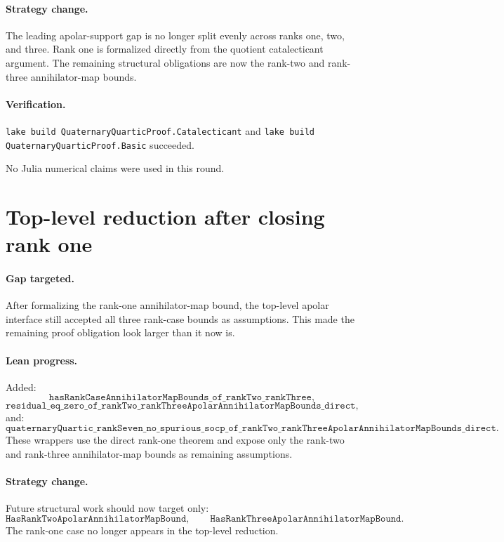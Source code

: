 \documentclass[11pt]{article}
\begin{document}
\paragraph{Strategy change.}
The leading apolar-support gap is no longer split evenly across ranks one,
two, and three.  Rank one is formalized directly from the quotient
catalecticant argument.  The remaining structural obligations are now the
rank-two and rank-three annihilator-map bounds.

\paragraph{Verification.}
\texttt{lake build QuaternaryQuarticProof.Catalecticant} and
\texttt{lake build QuaternaryQuarticProof.Basic} succeeded.

No Julia numerical claims were used in this round.

\section*{Top-level reduction after closing rank one}

\paragraph{Gap targeted.}
After formalizing the rank-one annihilator-map bound, the top-level apolar
interface still accepted all three rank-case bounds as assumptions.  This made
the remaining proof obligation look larger than it now is.

\paragraph{Lean progress.}
Added:
\[
\texttt{hasRankCaseAnnihilatorMapBounds\_of\_rankTwo\_rankThree},
\]
\[
\texttt{residual\_eq\_zero\_of\_rankTwo\_rankThreeApolarAnnihilatorMapBounds\_direct},
\]
and:
\[
\texttt{quaternaryQuartic\_rankSeven\_no\_spurious\_socp\_of\_rankTwo\_rankThreeApolarAnnihilatorMapBounds\_direct}.
\]
These wrappers use the direct rank-one theorem and expose only the rank-two
and rank-three annihilator-map bounds as remaining assumptions.

\paragraph{Strategy change.}
Future structural work should now target only:
\[
\texttt{HasRankTwoApolarAnnihilatorMapBound},
\qquad
\texttt{HasRankThreeApolarAnnihilatorMapBound}.
\]
The rank-one case no longer appears in the top-level reduction.
\end{document}
